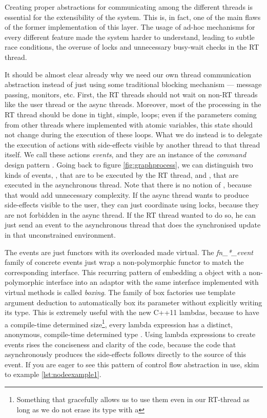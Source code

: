 Creating proper abstractions for communicating among the different
threads is essential for the extensibility of the system. This is, in
fact, one of the main flaws of the former implementation of this
layer. The usage of ad-hoc mechanisms for every different feature made
the system harder to understand, leading to subtle race conditions,
the overuse of locks and unnecessary busy-wait checks in the RT
thread.

It should be almost clear already why we need our own thread
communication abstraction instead of just using some traditional
blocking mechanism --- message passing, monitors, etc. First, the RT
threads should not wait on non-RT threads like the user thread or the
async threads. Moreover, most of the processing in the RT thread
should be done in tight, simple, loops; even if the parameters coming
from other threads where implemented with atomic variables, this state
should not change during the execution of these loops. What we do
instead is to delegate the execution of actions with side-effects
visible by another thread to that thread itself. We call these actions
\emph{events}, and they are an instance of the
\emph{command} design pattern 
\cite{gamma95design}. Going back to figure \ref{fig:graphprocess}, we
can distinguish two kinds of events, , that are to be
executed by the RT thread, and , that are executed
in the asynchronous thread. Note that there is no notion of
, because that would add unnecessary complexity. If
the async thread wants to produce side-effects visible to the user,
they can just coordinate using locks, because they are not forbidden
in the async thread. If the RT thread wanted to do so, he can just
send an event to the asynchronous thread that does the synchronised
update in that unconstrained environment.

The events are just functors with its overloaded 
made virtual. The \emph{fn\_*\_event} family of concrete events just
wrap a non-polymorphic functor to match the corresponding
interface. This recurring pattern of embedding a object with a
non-polymorphic interface into an adaptor with the same interface
implemented with virtual methods is called 
\emph{boxing}. The  family of box factories use
template argument deduction to automatically box its parameter without
explicitly writing its type. This is extremely useful with the new
C++11 lambdas, because to have a compile-time determined
size\footnote{Something that gracefully allows us to use them even in
  our RT-thread as long as we do not erase its type with a
  }, every lambda expression has a distinct,
anonymous, compile-time determined type \cite{jarvi10lambda}. Using
lambda expressions to create events rises the conciseness and clarity
of the code, because the code that asynchronously produces the
side-effects follows directly to the source of this event. If you are
eager to see this pattern of control flow abstraction in use, skim to
example \ref{lst:nodeexample1}.

